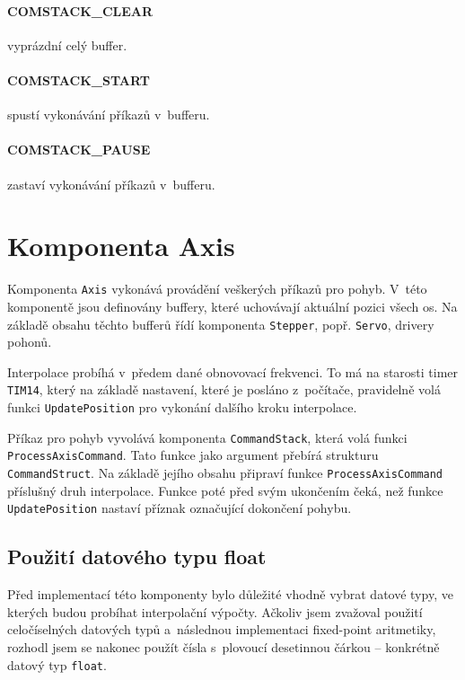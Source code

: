 		\paragraph{COMSTACK\_CLEAR}
		 vyprázdní celý buffer.
		
		\paragraph{COMSTACK\_START}
		 spustí vykonávání příkazů v~bufferu.
		 
		\paragraph{COMSTACK\_PAUSE}
		 zastaví vykonávání příkazů v~bufferu.		 
		
		
	\section{Komponenta Axis}
	
	Komponenta {\tt Axis} vykonává provádění veškerých příkazů pro pohyb. V~této komponentě jsou definovány buffery, které uchovávají aktuální  pozici všech os. Na základě obsahu těchto bufferů řídí komponenta {\tt  Stepper}, popř. {\tt Servo}, drivery pohonů.
	
	Interpolace probíhá v~předem dané obnovovací frekvenci. To má na starosti timer {\tt TIM14}, který na základě nastavení, které je posláno z~počítače, pravidelně volá funkci {\tt UpdatePosition} pro vykonání dalšího kroku interpolace.
	
	Příkaz pro pohyb vyvolává komponenta {\tt CommandStack}, která volá funkci {\tt ProcessAxisCommand}. Tato funkce jako argument přebírá strukturu {\tt CommandStruct}. Na základě jejího obsahu připraví funkce {\tt ProcessAxisCommand} příslušný druh interpolace. Funkce poté před svým ukončením čeká, než funkce {\tt UpdatePosition} nastaví příznak označující dokončení pohybu.
	
		\subsection{Použití datového typu float}
		Před implementací této komponenty bylo důležité vhodně vybrat datové typy, ve kterých budou probíhat interpolační výpočty. Ačkoliv jsem zvažoval použití celočíselných datových typů a~následnou implementaci fixed-point aritmetiky, rozhodl jsem se nakonec použít čísla s~plovoucí desetinnou čárkou -- konkrétně datový typ {\tt float}.
		

